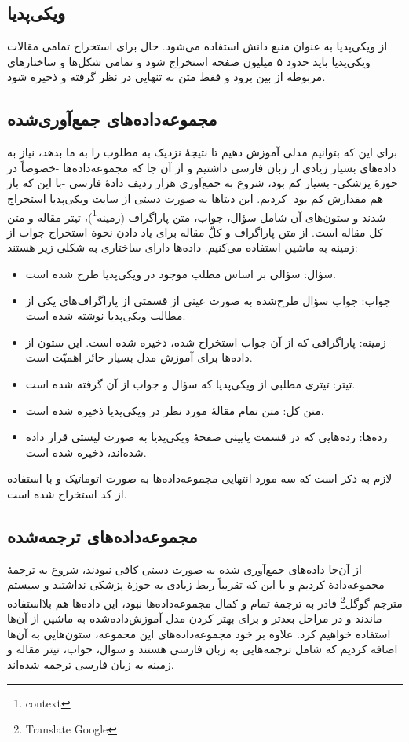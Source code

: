 \documentclass{CCI2020}
\begin{document}
\subsection{ویکی‌پدیا}
از ویکی‌پدیا به عنوان منبع دانش استفاده می‌شود. حال
برای استخراج تمامی مقالات ویکی‌پدیا باید حدود ۵ میلیون صفحه استخراج شود و تمامی شکل‌ها و ساختارهای مربوطه از بین برود و فقط متن به تنهایی در نظر گرفته و ذخیره شود.



\subsection{مجموعه‌داده‌های جمع‌آوری‌شده}
برای این که بتوانیم مدلی آموزش دهیم تا نتیجهٔ نزدیک به مطلوب را به ما بدهد، نیاز به داده‌های بسیار زیادی از زبان فارسی داشتیم و از آن جا که مجموعه‌داده‌ها -خصوصاً در حوزهٔ پزشکی- بسیار کم بود، شروع به جمع‌آوری هزار ردیف دادهٔ فارسی -با این که باز هم مقدارش کم بود- کردیم. این دیتاها به صورت دستی از سایت ویکی‌پدیا استخراج شدند و ستون‌های آن شامل سؤال، جواب، متن پاراگراف (زمینه\footnote{context})، تیتر مقاله و متن کل مقاله است. از متن پاراگراف و کلّ مقاله برای یاد دادن نحوهٔ استخراج جواب از زمینه به ماشین استفاده می‌کنیم.  داده‌ها دارای ساختاری به شکلی زیر هستند:
\begin{itemize}
    \item سؤال: سؤالی بر اساس مطلب موجود در ویکی‌پدیا طرح شده است.
    \item جواب: جواب سؤال طرح‌شده به صورت عینی از قسمتی از پاراگراف‌های یکی از مطالب ویکی‌پدیا  نوشته شده است.
    \item زمینه: پاراگرافی که از آن جواب استخراج شده، ذخیره شده است. این ستون از داده‌ها برای آموزش مدل بسیار حائز اهمیّت است.
    \item تیتر: تیتری مطلبی از ویکی‌پدیا که سؤال و جواب از آن گرفته شده است.
    \item متن کل: متن تمام مقالهٔ مورد نظر در ویکی‌پدیا ذخیره شده است.
    \item رده‌ها: رده‌هایی که در قسمت پایینی صفحهٔ ویکی‌پدیا به صورت لیستی قرار داده شده‌اند، ذخیره شده است.
\end{itemize}

لازم به ذکر است که سه مورد انتهایی مجموعه‌داده‌ها به صورت اتوماتیک و با استفاده از کد استخراج شده است.




\subsection{مجموعه‌داده‌های ترجمه‌شده}
از آن‌جا داده‌های جمع‌آوری شده به صورت دستی کافی نبودند، شروع به ترجمهٔ مجموعه‌دادهٔ  \cite{ref2} کردیم و با این که تقریباً ربط زیادی به حوزهٔ پزشکی نداشتند و  سیستم مترجم گوگل\footnote{Translate Google} قادر به ترجمهٔ تمام و کمال مجموعه‌داده‌ها نبود، این داده‌ها هم بلااستفاده ماندند و در مراحل بعدتر و برای بهتر کردن مدل آموزش‌داده‌شده به ماشین از آن‌ها استفاده خواهیم کرد. علاوه بر خود مجموعه‌داده‌های این مجموعه، ستون‌هایی به آن‌ها اضافه کردیم که شامل ترجمه‌هایی به زبان فارسی هستند و سوال، جواب، تیتر مقاله و زمینه به زبان فارسی ترجمه شده‌اند.
\end{document}
